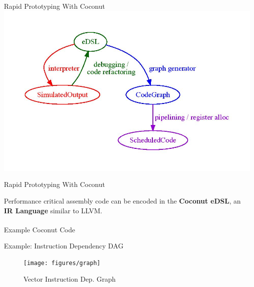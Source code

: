 \documentclass{beamer}
\begin{document}
\begin{darkframes}
\begin{frame}{Rapid Prototyping With Coconut}
    \includegraphics[scale=0.5]{figures/prototyping}
\end{frame}      

   
   
\begin{frame}{Rapid Prototyping With Coconut}

Performance critical assembly code can be encoded in the {\bf \color{green} Coconut eDSL},
an {\bf \color{green} IR Language} similar to LLVM. \\
\qquad \\
\alert{Example Coconut Code} \\
\coconutcode
\end{frame}

\begin{frame}{Example: Instruction Dependency DAG}
      \begin{figure}
        \texttt{[image: figures/graph]}
        \caption{Vector Instruction Dep. Graph}
      \end{figure}
    \end{frame}



\end{darkframes}
\end{document}
